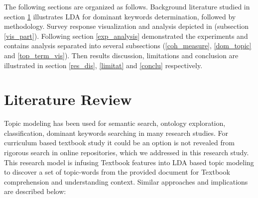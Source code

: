 \documentclass[sn-mathphys,Numbered]{sn-jnl}%
\theoremstyle{thmstyleone}%
\theoremstyle{thmstyletwo}%
\theoremstyle{thmstylethree}%
\begin{document}
\hfill
The following sections are organized as follows. Background literature studied in section \ref{lit_review} illustrates LDA for dominant keywords determination, followed by methodology. Survey response visualization and analysis depicted in (subsection \ref{vis_part}). Following section \ref{exp_analysis} demonstrated the experiments and contains analysis separated into several subsections (\ref{coh_measure}, \ref{dom_topic} and \ref{top_term_vis}). Then results discussion, limitations and conclusion are illustrated in section \ref{res_dis}, \ref{limitat} and \ref{conclu} respectively. 

  
\section{Literature Review}\label{lit_review}

Topic modeling has been used for semantic search, ontology exploration, classification, dominant keywords searching in many research studies. For curriculum based textbook study it could be an option is not revealed from rigorous search in online repositories, which we addressed in this research study. This research model is infusing Textbook features into LDA based topic modeling to discover a set of topic-words from the provided document for Textbook comprehension and understanding context. Similar approaches and implications are described below:
\end{document}
